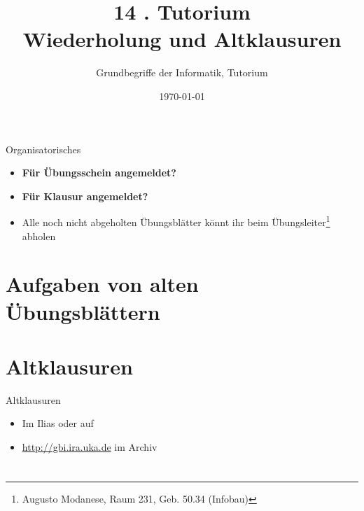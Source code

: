 




\title[Wiederholung]{14 . Tutorium\\ Wiederholung und Altklausuren}
\subtitle{Grundbegriffe der Informatik, Tutorium \hashtag\mytutnumber}
\date{\today}


\titleframe

\begin{frame}{Organisatorisches}
	\begin{itemize}
		\item \textbf{Für Übungsschein angemeldet?}
		\item \textbf{Für Klausur angemeldet?}
		\item Alle noch nicht abgeholten Übungsblätter könnt ihr beim Übungsleiter\footnote{Augusto Modanese, Raum 231, Geb. 50.34 (Infobau)} abholen
	\end{itemize}
\end{frame}

\roadmap


\section{Aufgaben von alten Übungsblättern}



\section{Altklausuren}
\begin{frame}{Altklausuren}
    \begin{itemize}
    	\item Im Ilias oder auf 
    	\item \url{http://gbi.ira.uka.de} im Archiv
    \end{itemize}
\end{frame}

\section{}

